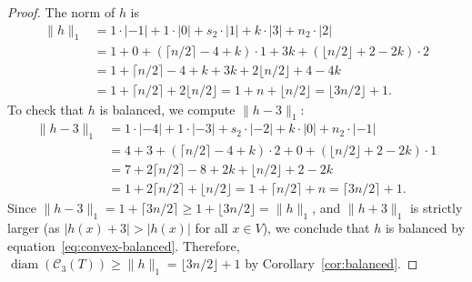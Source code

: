 \documentclass[12pt,reqno]{amsart}
\theoremstyle{definition}
\newcommand{\C}{\mathcal{C}}
\newcommand{\diam}{\operatorname{diam}}
\begin{document}
\begin{proof}
The norm of $h$ is
\begin{align*}
\|h\|_1 &= 1\cdot|-1| + 1\cdot|0| + s_2 \cdot |1| + k \cdot |3| + n_2 \cdot |2| \\
&= 1 + 0 + (\lceil n/2 \rceil - 4 + k) \cdot 1 + 3k + (\lfloor n/2 \rfloor + 2 - 2k) \cdot 2 \\
&= 1 + \lceil n/2 \rceil - 4 + k + 3k + 2\lfloor n/2 \rfloor + 4 - 4k \\
&= 1 + \lceil n/2 \rceil + 2\lfloor n/2 \rfloor = 1 + n + \lfloor n/2 \rfloor = \lfloor 3n/2 \rfloor + 1.
\end{align*}
To check that $h$ is balanced, we compute $\|h-3\|_1$:
\begin{align*}
\|h-3\|_1 &= 1\cdot|-4| + 1\cdot|-3| + s_2 \cdot |-2| + k \cdot |0| + n_2 \cdot |-1| \\
&= 4 + 3 + (\lceil n/2 \rceil - 4 + k) \cdot 2 + 0 + (\lfloor n/2 \rfloor + 2 - 2k) \cdot 1 \\
&= 7 + 2\lceil n/2 \rceil - 8 + 2k + \lfloor n/2 \rfloor + 2 - 2k \\
&= 1 + 2\lceil n/2 \rceil + \lfloor n/2 \rfloor = 1 + \lceil n/2 \rceil + n = \lceil 3n/2 \rceil + 1.
\end{align*}
Since $\|h-3\|_1 = 1 + \lceil 3n/2 \rceil \ge 1 + \lfloor 3n/2 \rfloor = \|h\|_1$, and $\|h+3\|_1$ is strictly larger (as $|h(x)+3| > |h(x)|$ for all $x\in V$), we conclude that $h$ is balanced by equation~\eqref{eq:convex-balanced}. Therefore, $\diam(\C_3(T)) \ge \|h\|_1 = \lfloor 3n/2 \rfloor + 1$ by Corollary~\ref{cor:balanced}.
\end{proof}
\end{document}
